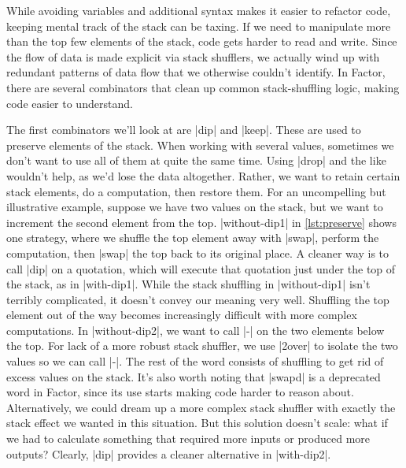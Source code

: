 While avoiding variables and additional syntax makes it easier to refactor
code, keeping mental track of the stack can be taxing.  If we need to
manipulate more than the top few elements of the stack, code gets harder to
read and write.  Since the flow of data is made explicit via stack shufflers,
we actually wind up with redundant patterns of data flow that we otherwise
couldn't identify.  In Factor, there are several combinators that clean up
common stack-shuffling logic, making code easier to understand.


The first combinators we'll look at are \factor|dip| and \factor|keep|.  These
are used to preserve elements of the stack.  When working with several values,
sometimes we don't want to use all of them at quite the same time.  Using
\factor|drop| and the like wouldn't help, as we'd lose the data altogether.
Rather, we want to retain certain stack elements, do a computation, then
restore them.  For an uncompelling but illustrative example, suppose we have
two values on the stack, but we want to increment the second element from the
top.  \factor|without-dip1| in \vref{lst:preserve} shows one strategy, where we
shuffle the top element away with \factor|swap|, perform the computation, then
\factor|swap| the top back to its original place.  A cleaner way is to call
\factor|dip| on a quotation, which will execute that quotation just under the
top of the stack, as in \factor|with-dip1|.  While the stack shuffling in
\factor|without-dip1| isn't terribly complicated, it doesn't convey our meaning
very well.  Shuffling the top element out of the way becomes increasingly
difficult with more complex computations.  In \factor|without-dip2|, we want to
call \factor|-| on the two elements below the top.  For lack of a more robust
stack shuffler, we use \factor|2over| to isolate the two values so we can call
\factor|-|.  The rest of the word consists of shuffling to get rid of excess
values on the stack.  It's also worth noting that \factor|swapd| is a
deprecated word in Factor, since its use starts making code harder to reason
about.  Alternatively, we could dream up a more complex stack shuffler with
exactly the stack effect we wanted in this situation.  But this solution
doesn't scale: what if we had to calculate something that required more inputs
or produced more outputs?  Clearly, \factor|dip| provides a cleaner alternative
in \factor|with-dip2|.

